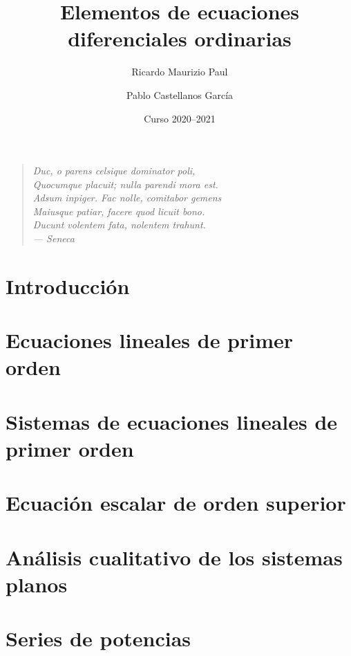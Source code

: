 \documentclass[a4paper, 10pt]{book}
\title{Elementos de ecuaciones diferenciales ordinarias}
\author{Ricardo Maurizio Paul \and Pablo Castellanos García}
\date{Curso 2020--2021}
\begin{document}
\maketitle

\clearpage
\vspace*{\fill}
\thispagestyle{empty} %
\begin{quotation}
\raggedleft
\em %
Duc, o parens celsique dominator poli, \\
Quocumque placuit; nulla parendi mora est. \\
Adsum inpiger. Fac nolle, comitabor gemens \\
Maiusque patiar, facere quod licuit bono. \\
Ducunt volentem fata, nolentem trahunt. \\
\bigskip
--- Seneca
\end{quotation}
\vspace*{\fill}

\tableofcontents

\setcounter{chapter}{-1}
\chapter{Introducción}


\chapter{Ecuaciones lineales de primer orden}
\label{chap:capitulo1}


\chapter{Sistemas de ecuaciones lineales de primer orden}
\label{chap:capitulo2}



\chapter{Ecuación escalar de orden superior}
\label{chap:capitulo3}


\chapter{Análisis cualitativo de los sistemas planos}
\label{chap:capitulo4}


\chapter{Series de potencias}
\label{chap:capitulo5}

\end{document}
